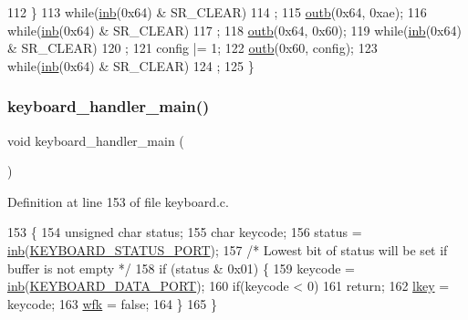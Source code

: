 \begin{DoxyCode}
112     \}
113     \textcolor{keywordflow}{while}(\hyperlink{a00158_a0223c8898dfec29069879dc51076e28a_a0223c8898dfec29069879dc51076e28a}{inb}(0x64) & SR\_CLEAR)
114         ;
115     \hyperlink{a00158_aa37f5841c54156a4b14fc0d6f626b44f_aa37f5841c54156a4b14fc0d6f626b44f}{outb}(0x64, 0xae);
116     \textcolor{keywordflow}{while}(\hyperlink{a00158_a0223c8898dfec29069879dc51076e28a_a0223c8898dfec29069879dc51076e28a}{inb}(0x64) & SR\_CLEAR)
117         ;
118     \hyperlink{a00158_aa37f5841c54156a4b14fc0d6f626b44f_aa37f5841c54156a4b14fc0d6f626b44f}{outb}(0x64, 0x60);
119     \textcolor{keywordflow}{while}(\hyperlink{a00158_a0223c8898dfec29069879dc51076e28a_a0223c8898dfec29069879dc51076e28a}{inb}(0x64) & SR\_CLEAR)
120         ;
121     config |= 1;
122     \hyperlink{a00158_aa37f5841c54156a4b14fc0d6f626b44f_aa37f5841c54156a4b14fc0d6f626b44f}{outb}(0x60, config);
123     \textcolor{keywordflow}{while}(\hyperlink{a00158_a0223c8898dfec29069879dc51076e28a_a0223c8898dfec29069879dc51076e28a}{inb}(0x64) & SR\_CLEAR)
124         ;
125 \}
\end{DoxyCode}
\mbox{\label{a00035_adffe6abc4a32b3b10985ec9324bce2af_adffe6abc4a32b3b10985ec9324bce2af}} 
\subsubsection{\texorpdfstring{keyboard\+\_\+handler\+\_\+main()}{keyboard\_handler\_main()}}
{\footnotesize\ttfamily void keyboard\+\_\+handler\+\_\+main (\begin{DoxyParamCaption}{ }\end{DoxyParamCaption})}



Definition at line 153 of file keyboard.\+c.


\begin{DoxyCode}
153                                  \{
154     \textcolor{keywordtype}{unsigned} \textcolor{keywordtype}{char} status;
155     \textcolor{keywordtype}{char} keycode;
156     status = \hyperlink{a00158_a0223c8898dfec29069879dc51076e28a_a0223c8898dfec29069879dc51076e28a}{inb}(\hyperlink{a00035_ab79ca089665bc7f5cc151883d1bc69ed_ab79ca089665bc7f5cc151883d1bc69ed}{KEYBOARD\_STATUS\_PORT});
157     \textcolor{comment}{/* Lowest bit of status will be set if buffer is not empty */}
158     \textcolor{keywordflow}{if} (status & 0x01) \{
159         keycode = \hyperlink{a00158_a0223c8898dfec29069879dc51076e28a_a0223c8898dfec29069879dc51076e28a}{inb}(\hyperlink{a00035_a49e0a04e81098085d2948c1e9f8c99cb_a49e0a04e81098085d2948c1e9f8c99cb}{KEYBOARD\_DATA\_PORT});
160         \textcolor{keywordflow}{if}(keycode < 0)
161             \textcolor{keywordflow}{return};
162         \hyperlink{a00032_ade374650022cb30c4f5591a8dafad685_ade374650022cb30c4f5591a8dafad685}{lkey} = keycode;
163         \hyperlink{a00032_a6ddd5223379778858edc46ffbec19775_a6ddd5223379778858edc46ffbec19775}{wfk} = \textcolor{keyword}{false};
164     \}
165 \}
\end{DoxyCode}
